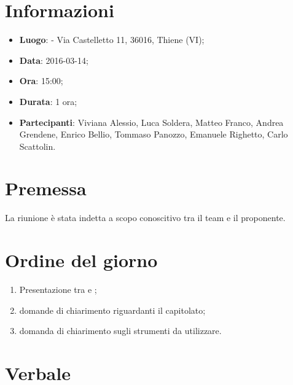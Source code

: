 \documentclass[a4paper,titlepage]{article}
\begin{document}
\maketitle

\newpage
\tableofcontents

\newpage
\section{Informazioni}
\label{sec:Informazioni}

\begin{itemize}
  \item \textbf{Luogo}: \PROPONENTE {} - Via Castelletto 11, 36016, Thiene (VI);
  \item \textbf{Data}: 2016-03-14;
  \item \textbf{Ora}: 15:00;
  \item \textbf{Durata}: 1 ora;
  \item \textbf{Partecipanti}: Viviana Alessio, Luca Soldera, Matteo Franco, Andrea Grendene, Enrico Bellio, Tommaso Panozzo, Emanuele Righetto, Carlo Scattolin.
\end{itemize}

\newpage
\section{Premessa}

La riunione è stata indetta a scopo conoscitivo tra il team e il proponente.

\section{Ordine del giorno}
\label{sec:OrdineDelGiorno}

\begin{enumerate}
  \item Presentazione tra \AUTORE{} e \PROPONENTE;
  \item domande di chiarimento riguardanti il capitolato;
  \item domanda di chiarimento sugli strumenti da utilizzare.
\end{enumerate}

\newpage
\section{Verbale}
\label{sec:Verbale}
\end{document}
